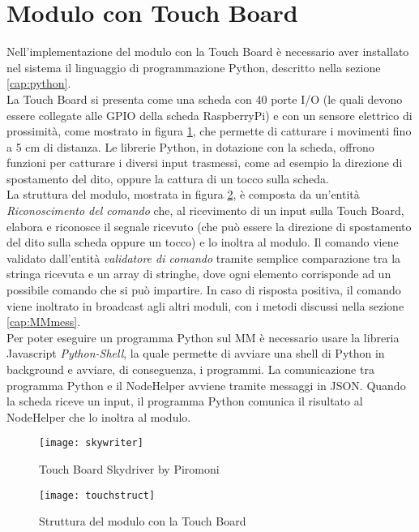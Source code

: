 \section{Modulo con Touch Board}\label{cap:touch}
Nell'implementazione del modulo con la Touch Board \`e necessario aver installato nel sistema
il linguaggio di programmazione Python, descritto nella sezione \ref{cap:python}.\\
La Touch Board si presenta come una scheda con 40 porte I/O (le quali devono essere collegate alle
GPIO della scheda RaspberryPi) e con un sensore elettrico di prossimit\`a, come mostrato in figura \ref{fig:TouchBoard}, che permette di catturare i movimenti fino a
5 cm di distanza.
Le librerie Python, in dotazione con la scheda, offrono funzioni per catturare i diversi input trasmessi, come ad esempio
la direzione di spostamento del dito, oppure la cattura di un tocco sulla scheda.\\
La struttura del modulo, mostrata in figura \ref{fig:structtouch}, \`e composta da un'entit\`a \emph{Riconoscimento del comando} che,
al ricevimento di un input
sulla Touch Board, elabora e riconosce il segnale ricevuto (che pu\`o essere la direzione di spostamento del dito sulla scheda oppure un tocco)
e lo inoltra al modulo.
Il comando viene validato dall'entit\`a \emph{validatore di comando} tramite semplice comparazione tra la stringa ricevuta e un array di stringhe,
dove ogni elemento corrisponde
ad un possibile comando che si pu\`o impartire. In caso di risposta positiva, il comando viene inoltrato in broadcast agli altri moduli,
con i metodi discussi nella sezione \ref{cap:MMmess}.\\
Per poter eseguire un programma Python sul MM \`e necessario usare la libreria Javascript \emph{Python-Shell}, la quale
permette di avviare una shell di Python in background e avviare, di conseguenza, i programmi.
La comunicazione tra programma Python e il NodeHelper avviene tramite messaggi in JSON. Quando la scheda riceve un input,
il programma Python comunica il risultato al NodeHelper che lo inoltra al modulo.
\begin{figure}[H]
    \texttt{[image: skywriter]}
    \caption{Touch Board Skydriver by Piromoni}
    \label{fig:TouchBoard}
\end{figure}

\begin{figure}[H]
    \texttt{[image: touchstruct]}
    \caption{Struttura del modulo con la Touch Board}
    \label{fig:structtouch}
\end{figure}
